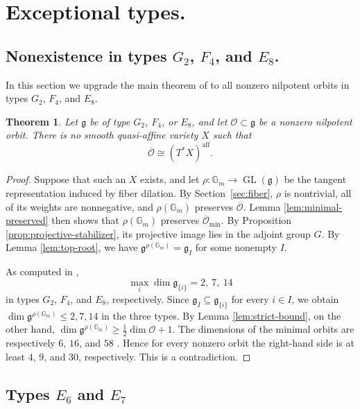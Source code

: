 \documentclass[10pt,a4paper]{amsart}
\newtheorem{theorem}{Theorem}[section]
\newcommand{\Gm}{\mathbb G_m}
\newcommand{\aff}{\mathrm{aff}}
\begin{document}
\section{Exceptional types.}

\subsection{Nonexistence in types \texorpdfstring{$G_2$, $F_4$, and $E_8$.}{G2, F4, and E8}}\label{sec:G2F4E8}

In this section we upgrade the main theorem of \cite{Jia} to all
nonzero nilpotent orbits in types $G_2$, $F_4$, and $E_8$.

\begin{theorem}\label{thm:negative-exceptional}
Let $\mathfrak g$ be of type $G_2$, $F_4$, or $E_8$, and let
$\mathcal O\subset\mathfrak g$ be a nonzero nilpotent orbit.
There is no smooth quasi-affine variety $X$ such that
\[
\overline{\mathcal O}\cong(T^*X)^{\aff}.
\]
\end{theorem}

\begin{proof}
Suppose that such an $X$ exists, and let
$\rho:\Gm\to\operatorname{GL}(\mathfrak g)$ be the tangent
representation induced by fiber dilation. By Section~\ref{sec:fiber},
$\rho$ is nontrivial, all of its weights are nonnegative, and
$\rho(\Gm)$ preserves
$\overline{\mathcal O}$. Lemma \ref{lem:minimal-preserved} then shows
that $\rho(\Gm)$ preserves $\overline{\mathcal O}_{\min}$.
By Proposition \ref{prop:projective-stabilizer}, its projective image
lies in the adjoint group $G$.
By Lemma \ref{lem:top-root}, we have
$\mathfrak g^{\rho(\Gm)}=\mathfrak g_I$ for some nonempty $I$.

As computed in \cite[Proposition 3.1]{Jia},
\[
\max_i\dim\mathfrak g_{\{i\}}
=
2,\ 7,\ 14
\]
in types $G_2$, $F_4$, and $E_8$, respectively.
Since $\mathfrak g_I\subseteq\mathfrak g_{\{i\}}$ for every $i\in I$,
we obtain $\dim\mathfrak g^{\rho(\Gm)}\leq2,7,14$ in the three types.
By Lemma \ref{lem:strict-bound}, on the other hand,
$\dim\mathfrak g^{\rho(\Gm)}\geq\frac12\dim\mathcal O+1$.
The dimensions of the minimal orbits are respectively $6$, $16$, and $58$
\cite[Section 8.4]{CM}. Hence for every nonzero orbit the right-hand
side is at least $4$, $9$, and $30$, respectively.
This is a contradiction.
\end{proof}

\subsection{Types \texorpdfstring{$E_6$ and $E_7$}{E6 and E7}}\label{sec:E6E7}
\end{document}
